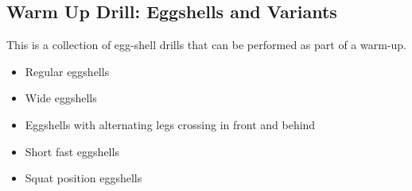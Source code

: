 \subsection*{Warm Up Drill: Eggshells and Variants}

This is a collection of egg-shell drills that can be performed as part of a warm-up. 

\begin{itemize}
    \item Regular eggshells  
    \item Wide eggshells
    \item Eggshells with alternating legs crossing in front and behind 
    \item Short fast eggshells 
    \item Squat position eggshells
\end{itemize}
